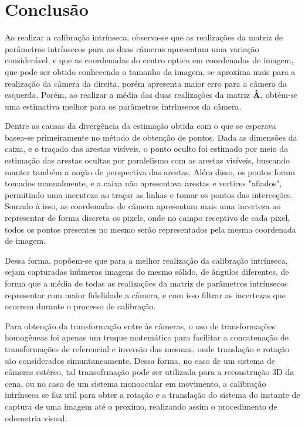 \clearpage
\section{Conclusão}

Ao realizar a calibração intrínseca, observa-se que as realizações da matriz de parâmetros intrínsecos para as duas câmeras apresentam uma variação considerável, e que as coordenadas do centro optico em coordenadas de imagem, que pode ser obtido conhecendo o tamanho da imagem, se aproxima mais para a realização da câmera da direita, porém apresenta maior erro para a câmera da esquerda. Porém, ao realizar a média das duas realizações da matriz $\mathbf{\hat{A}}$, obtém-se uma estimativa melhor para os parâmetros intrinsecos da câmera.

Dentre as causas da divergência da estimação obtida com o que se esperava basea-se primeiramente no método de obtenção de pontos. Dada as dimensões da caixa, e o traçado das arestas visíveis, o ponto oculto foi estimado por meio da estimação das arestas ocultas por paralelismo com as arestas visíveis, buscando manter também a noção de perspectiva das arestas. Além disso, os pontos foram tomados manualmente, e a caixa não apresentava arestas e vertices "afiados", permitindo uma incenteza ao traçar as linhas e tomar os pontos das interceções. Somado à isso, as coordenadas de câmera apresentam mais uma incerteza ao representar de forma discreta os pixels, onde no campo receptivo de cada pixel, todos os pontos presentes no mesmo serão representados pela mesma coordenada de imagem.

Dessa forma, popõem-se que para a melhor realização da calibração intrínseca, sejam capturadas inúmeras imagens do mesmo sólido, de ângulos diferentes, de forma que a média de todas as realizações da matriz de parâmetros intrínsecos representar com maior fidelidade a câmera, e com isso filtrar as incertezas que ocorrem durante o processo de calibração.

Para obtenção da transformação entre às câmeras, o uso de transformações homogêneas foi apenas um truque matemático para facilitar a concatenação de transformações de referencial e inversão das mesmas, onde translação e rotação são considerados simuntaneamente. Dessa forma, no caso de um sistema de câmeras estéreo, tal transofrmação pode ser utilizada para a reconstrução 3D da cena, ou no caso de um sistema monoocular em movimento, a calibração intrínseca se faz util para obter a rotação e a translação do sistema do instante de captura de uma imagem até o proximo, realizando assim o procedimento de odometria visual.
